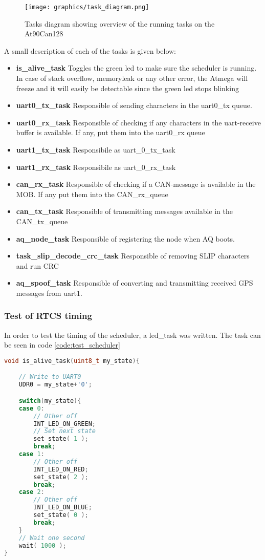 \begin{figure}[H]
    \center
    \texttt{[image: graphics/task\_diagram.png]}
  \caption{Tasks diagram showing overview of the running tasks on the At90Can128}
    \label{fig:task_diagram_atmega}
\end{figure}
A small description of each of the tasks is given below:
\begin{itemize}
\item \textbf{ is\_alive\_task} Toggles the green led to make sure the scheduler is running. In case of stack overflow, memoryleak or any other error, the Atmega will freeze and it will easily be detectable since the green led stops blinking
\item \textbf{ uart0\_tx\_task} Responsible of sending characters in the uart0\_tx queue.
\item \textbf{ uart0\_rx\_task} Responsible of checking if any characters in the uart-receive buffer is available. If any, put them into the uart0\_rx queue
\item \textbf{ uart1\_tx\_task} Responsibile as uart\_0\_tx\_task
\item \textbf{ uart1\_rx\_task} Responsibile as uart\_0\_rx\_task
\item \textbf{ can\_rx\_task} Responsible of checking if a CAN-message is available in the MOB. If any put them into the CAN\_rx\_queue
\item \textbf{ can\_tx\_task} Responsible of transmitting messages available in the CAN\_tx\_queue
\item \textbf{ aq\_node\_task} Responsible of registering the node when AQ boots.
\item \textbf{ task\_slip\_decode\_crc\_task} Responsible of removing SLIP characters and run CRC
\item \textbf{ aq\_spoof\_task} Responsible of converting and transmitting received GPS messages from uart1.
\end{itemize}

\subsubsection*{Test of RTCS timing} \label{sec:test_of_rtcs_timing}
In order to test the timing of the scheduler, a led\_task was written. The task can be seen in code \ref{code:test_scheduler}
\begin{lstlisting}[language = c, caption = RTCS task used in timing test, label=code:test_scheduler]
void is_alive_task(uint8_t my_state){

	// Write to UART0
	UDR0 = my_state+'0';

	switch(my_state){
	case 0:
		// Other off
		INT_LED_ON_GREEN;	
		// Set next state
	    set_state( 1 );
		break;
	case 1:
		// Other off
		INT_LED_ON_RED;
	    set_state( 2 );
		break;
	case 2:
		// Other off
		INT_LED_ON_BLUE;
	    set_state( 0 );
		break;
	}
	// Wait one second
	wait( 1000 );
}
\end{lstlisting}


